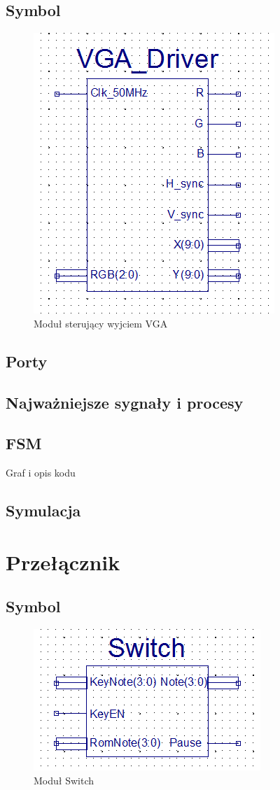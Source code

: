 \documentclass[a4paper]{report}
\begin{document}
		\subsection{Symbol}
			\begin{figure}[h!]
				\centering
				\includegraphics{vgadriver2.png}
				\caption{Moduł sterujący wyjciem VGA}
			\end{figure}
		\subsection{Porty}
		\subsection{Najważniejsze sygnały i procesy}
		\subsection{FSM}
		Graf i opis kodu
		\subsection{Symulacja}
	\newpage
	\section{Przełącznik}
		\subsection{Symbol}	
			\begin{figure}[h!]
				\centering
				\includegraphics{switch2.png}
				\caption{Moduł Switch}
			\end{figure}
\end{document}
